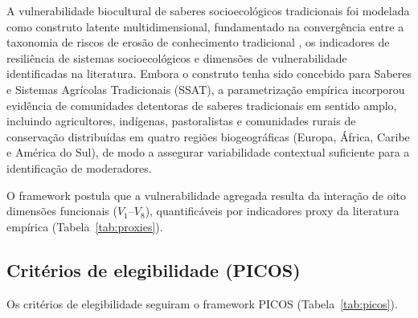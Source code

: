 \documentclass[12pt,a4paper]{article}
\begin{document}
A vulnerabilidade biocultural de saberes socioecológicos tradicionais foi modelada como construto latente multidimensional, fundamentado na convergência entre a taxonomia de riscos de erosão de conhecimento tradicional \citep{Agrawal2002}, os indicadores de resiliência de sistemas socioecológicos \citep{Folke2016} e dimensões de vulnerabilidade identificadas na literatura. Embora o construto tenha sido concebido para Saberes e Sistemas Agrícolas Tradicionais (SSAT), a parametrização empírica incorporou evidência de comunidades detentoras de saberes tradicionais em sentido amplo, incluindo agricultores, indígenas, pastoralistas e comunidades rurais de conservação distribuídas em quatro regiões biogeográficas (Europa, África, Caribe e América do Sul), de modo a assegurar variabilidade contextual suficiente para a identificação de moderadores.

O framework postula que a vulnerabilidade agregada resulta da interação de oito dimensões funcionais ($V_1$--$V_8$), quantificáveis por indicadores proxy da literatura empírica (Tabela~\ref{tab:proxies}).

\subsection{Critérios de elegibilidade (PICOS)}
\label{sec:picos}

Os critérios de elegibilidade seguiram o framework PICOS (Tabela~\ref{tab:picos}).
\end{document}
